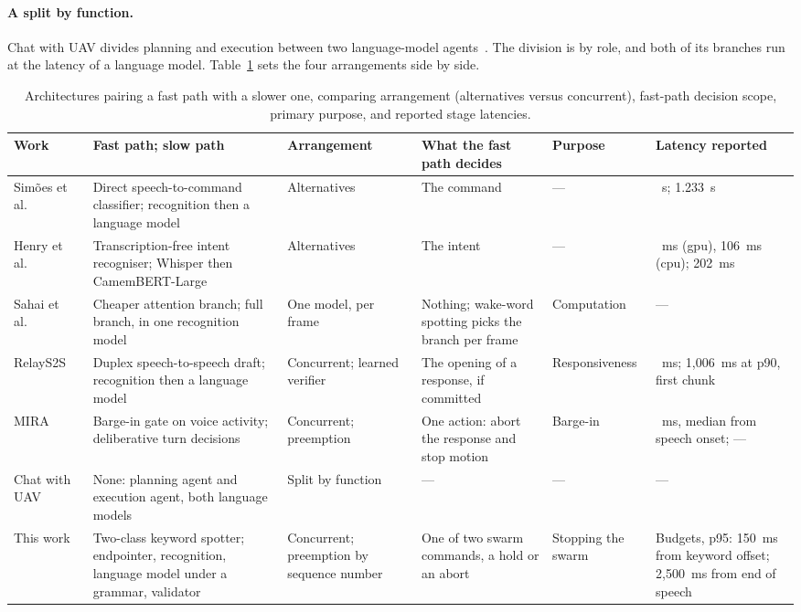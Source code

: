 \paragraph{A split by function.} Chat with UAV divides planning and execution between two
language-model agents~\cite{chatwithuav2025}. The division is by role, and both of its branches run
at the latency of a language model. Table~\ref{tab:soa-dual-path} sets the four arrangements side by
side.

\begin{table}[htbp]
\centering
\footnotesize
\caption[Architectures with a fast and a slow path]{Architectures pairing a fast path with a slower one, comparing arrangement (alternatives versus concurrent), fast-path decision scope, primary purpose, and reported stage latencies.}
\label{tab:soa-dual-path}
\begin{tabularx}{\textwidth}{@{}>{\raggedright\arraybackslash}p{1.9cm} >{\raggedright\arraybackslash}X >{\raggedright\arraybackslash}p{2.0cm} >{\raggedright\arraybackslash}X >{\raggedright\arraybackslash}p{2.35cm} >{\raggedright\arraybackslash}p{1.9cm}@{}}
\toprule
Work & Fast path; slow path & Arrangement & What the fast path decides & Purpose & Latency reported \\
\midrule
Sim\~oes et al.~\cite{simoes2024} & Direct speech-to-command classifier; recognition then a language model & Alternatives & The command & --- & 0.021~s; 1.233~s \\
Henry et al.~\cite{henry2026} & Transcription-free intent recogniser; Whisper then CamemBERT-Large & Alternatives & The intent & --- & 7~ms (\gls{gpu}), 106~ms (\gls{cpu}); 202~ms \\
Sahai et al.~\cite{dualattn2023} & Cheaper attention branch; full branch, in one recognition model & One model, per frame & Nothing; wake-word spotting picks the branch per frame & Computation & --- \\
RelayS2S~\cite{relays2s} & Duplex speech-to-speech draft; recognition then a language model & Concurrent; learned verifier & The opening of a response, if committed & Responsiveness & 81~ms; 1{,}006~ms at p90, first chunk \\
MIRA~\cite{mira} & Barge-in gate on voice activity; deliberative turn decisions & Concurrent; preemption & One action: abort the response and stop motion & Barge-in & 466~ms, median from speech onset; --- \\
Chat with UAV~\cite{chatwithuav2025} & None: planning agent and execution agent, both language models & Split by function & --- & --- & --- \\
\midrule
This work & Two-class keyword spotter; endpointer, recognition, language model under a grammar, validator & Concurrent; preemption by sequence number & One of two swarm commands, a hold or an abort & Stopping the swarm & Budgets, p95: 150~ms from keyword offset; 2{,}500~ms from end of speech \\
\bottomrule
\end{tabularx}
\end{table}

